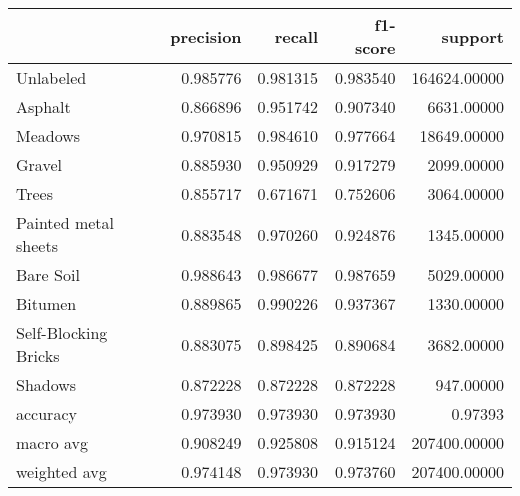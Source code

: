 \begin{tabular}{lrrrr}
\toprule
{} &  precision &    recall &  f1-score &       support \\
\midrule
Unlabeled            &   0.985776 &  0.981315 &  0.983540 &  164624.00000 \\
Asphalt              &   0.866896 &  0.951742 &  0.907340 &    6631.00000 \\
Meadows              &   0.970815 &  0.984610 &  0.977664 &   18649.00000 \\
Gravel               &   0.885930 &  0.950929 &  0.917279 &    2099.00000 \\
Trees                &   0.855717 &  0.671671 &  0.752606 &    3064.00000 \\
Painted metal sheets &   0.883548 &  0.970260 &  0.924876 &    1345.00000 \\
Bare Soil            &   0.988643 &  0.986677 &  0.987659 &    5029.00000 \\
Bitumen              &   0.889865 &  0.990226 &  0.937367 &    1330.00000 \\
Self-Blocking Bricks &   0.883075 &  0.898425 &  0.890684 &    3682.00000 \\
Shadows              &   0.872228 &  0.872228 &  0.872228 &     947.00000 \\
accuracy             &   0.973930 &  0.973930 &  0.973930 &       0.97393 \\
macro avg            &   0.908249 &  0.925808 &  0.915124 &  207400.00000 \\
weighted avg         &   0.974148 &  0.973930 &  0.973760 &  207400.00000 \\
\bottomrule
\end{tabular}
